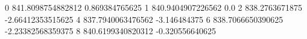 0 841.8098754882812 0.869384765625
1 840.9404907226562 0.0
2 838.2763671875 -2.66412353515625
4 837.7940063476562 -3.146484375
6 838.7066650390625 -2.23382568359375
8 840.6199340820312 -0.320556640625
